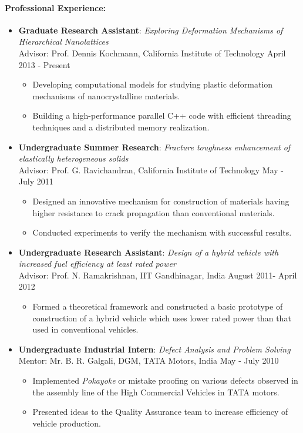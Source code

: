 \documentclass[10pt,fleqn]{article}
\begin{document}
\paragraph*{Professional Experience:}
\vspace{-10pt}
\begin{itemize}
\setlength{\itemsep}{8pt}
\setlength{\parskip}{0pt}
\item[] \textbf{Graduate Research Assistant}: \emph{Exploring Deformation Mechanisms of Hierarchical Nanolattices} \\
		 Advisor: Prof. Dennis Kochmann, California Institute of Technology \hfill April 2013 - Present 
		  \begin{itemize}
		  \item Developing computational models for studying plastic deformation mechanisms of nanocrystalline materials.
		  \item Building a high-performance parallel C++ code with efficient threading techniques and a distributed memory realization. 
 		  \end{itemize}
\item[] \textbf{Undergraduate Summer Research}: \emph{Fracture toughness enhancement of elastically heterogeneous solids} \\
		  Advisor: Prof. G. Ravichandran, California Institute of Technology \hfill May - July 2011
		   \begin{itemize}
			\item Designed an innovative mechanism for construction of materials having higher resistance to crack propagation than conventional materials.
			\item Conducted experiments to verify the mechanism with successful results.
 			\end{itemize}
\item[] \textbf{Undergraduate Research Assistant}: \emph{Design of a hybrid vehicle with increased fuel efficiency at least rated power}\\		
		  Advisor: Prof. N. Ramakrishnan, IIT Gandhinagar, India \hfill August 2011- April 2012
		   \begin{itemize}
			\item Formed a theoretical framework and constructed a basic prototype of construction of a hybrid vehicle which uses lower rated power than that used in conventional vehicles.
 			\end{itemize} 
\item[] \textbf{Undergraduate Industrial Intern}: \emph{Defect Analysis and Problem Solving} \\
		 Mentor: Mr. B. R. Galgali, DGM, TATA Motors, India \hfill May - July 2010
		    \begin{itemize}
			\item Implemented \emph{Pokayoke} or mistake proofing on various defects observed in the assembly line of the High Commercial Vehicles in TATA motors.
			\item Presented ideas to the Quality Assurance team to increase efficiency of vehicle production.
 			\end{itemize} 			
\end{itemize}
\end{document}
